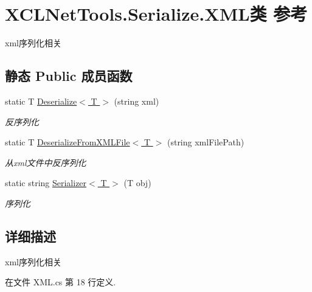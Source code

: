 \hypertarget{class_x_c_l_net_tools_1_1_serialize_1_1_x_m_l}{\section{X\-C\-L\-Net\-Tools.\-Serialize.\-X\-M\-L类 参考}
\label{class_x_c_l_net_tools_1_1_serialize_1_1_x_m_l}
}


xml序列化相关  


\subsection*{静态 Public 成员函数}
\begin{DoxyCompactItemize}
\item 
static T \hyperlink{class_x_c_l_net_tools_1_1_serialize_1_1_x_m_l_a10f494104b432660b2cbfbd686425ff9}{Deserialize$<$ T $>$} (string xml)
\begin{DoxyCompactList}\small\item\em 反序列化 \end{DoxyCompactList}\item 
static T \hyperlink{class_x_c_l_net_tools_1_1_serialize_1_1_x_m_l_afdebd810bc96d095cab8ccdf8aaca684}{Deserialize\-From\-X\-M\-L\-File$<$ T $>$} (string xml\-File\-Path)
\begin{DoxyCompactList}\small\item\em 从xml文件中反序列化 \end{DoxyCompactList}\item 
static string \hyperlink{class_x_c_l_net_tools_1_1_serialize_1_1_x_m_l_a9540436b849eff236f8353cad8b20658}{Serializer$<$ T $>$} (T obj)
\begin{DoxyCompactList}\small\item\em 序列化 \end{DoxyCompactList}\end{DoxyCompactItemize}


\subsection{详细描述}
xml序列化相关 



在文件 X\-M\-L.\-cs 第 18 行定义.



